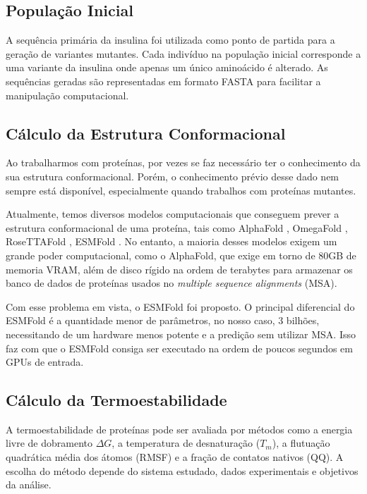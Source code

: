\documentclass[12pt]{extarticle}
\begin{document}
\subsection{População Inicial}

A sequência primária da insulina foi utilizada como ponto de partida para a
geração de variantes mutantes. Cada indivíduo na população inicial corresponde
a uma variante da insulina onde apenas um único aminoácido é alterado. As
sequências geradas são representadas em formato FASTA para facilitar a
manipulação computacional.

\subsection{Cálculo da Estrutura Conformacional}

Ao trabalharmos com proteínas, por vezes se faz necessário ter o conhecimento da sua
estrutura conformacional. Porém, o conhecimento prévio desse dado nem sempre está disponível,
especialmente quando trabalhos com proteínas mutantes. 

Atualmente, temos diversos modelos computacionais que conseguem prever a
estrutura conformacional de uma proteína, tais como AlphaFold \cite{alphafold},
OmegaFold \cite{omegafold}, RoseTTAFold \cite{rosettafold}, ESMFold
\cite{esmfold}. No entanto, a maioria desses modelos exigem um grande poder
computacional, como o AlphaFold, que exige em torno de 80GB de memoria VRAM,
além de disco rígido na ordem de terabytes para armazenar os banco de dados de
proteínas usados no \textit{multiple sequence alignments} (MSA).

Com esse problema em vista, o ESMFold foi proposto. O principal diferencial do
ESMFold é a quantidade menor de parâmetros, no nosso caso, 3 bilhões,
necessitando de um hardware menos potente e a predição sem utilizar MSA. Isso
faz com que o ESMFold consiga ser executado na ordem de poucos segundos em GPUs
de entrada.

\subsection{Cálculo da Termoestabilidade}

A termoestabilidade de proteínas pode ser avaliada por métodos como a energia
livre de dobramento $\Delta G$, a temperatura de desnaturação ($T_m$), a flutuação
quadrática média dos átomos (RMSF) e a fração de contatos nativos (QQ). A
escolha do método depende do sistema estudado, dados experimentais e objetivos
da análise.
\end{document}
